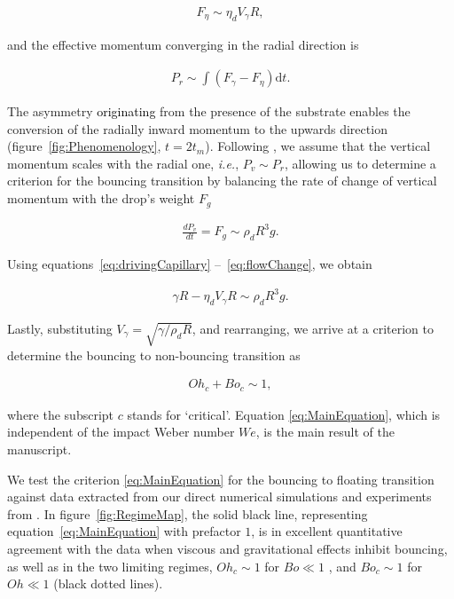 \documentclass{jfm}
\newcommand{\Ohn}{\mathit{Oh}}
\newcommand{\Ohc}{\mathit{Oh}_\mathit{c}}
\newcommand{\Wen}{\mathit{We}}
\newcommand{\Bon}{\mathit{Bo}}
\newcommand{\Boc}{\mathit{Bo}_\mathit{c}}
\newcommand{\revRev}[1]{\textcolor{black}{#1}}
\begin{document}
\begin{align}
	\label{eq:resistVisc}
	F_\eta \sim \eta_d V_\gamma R,
\end{align}

\noindent and the effective momentum converging in the radial direction is

\begin{align}
	\label{eq:flowChange}
	P_r \sim \int \left(F_\gamma - F_\eta\right) \mathrm{d}t.
\end{align}

\noindent The asymmetry \revRev{originating} from the presence of the substrate enables the conversion of the radially inward momentum to the upwards direction (figure~\ref{fig:Phenomenology}, $t = 2t_m$). Following \citet{mouterde2017merging, lecointre2019ballistics}, we assume that the vertical momentum scales with the radial one, {\it i.e.}, $P_v \sim P_r$, allowing us to determine a criterion for the bouncing transition by balancing the rate of change of vertical momentum with the drop's weight $F_g$

\begin{align}
	\label{eq:competeGravity1}
	\frac{dP_v}{dt} = F_g \sim \rho_d R^3 g.
\end{align}

\noindent Using equations~\eqref{eq:drivingCapillary} --~\eqref{eq:flowChange}, we obtain 

\begin{align}
	\label{eq:competeGravity3}
	\gamma R - \eta_d V_\gamma R \sim \rho_dR^3g.
\end{align}

\noindent Lastly, substituting $V_\gamma = \sqrt{\gamma/\rho_dR}$, and rearranging, we arrive at a criterion to determine the bouncing to non-bouncing transition as 

\begin{align}
	\label{eq:MainEquation}
	\Ohc + \Boc \sim 1,
\end{align}

\noindent where the subscript $c$ stands for \lq critical\rq.
Equation \eqref{eq:MainEquation}, which is independent of the impact Weber number $\Wen$, is the main result of the manuscript.
 
We test the criterion \eqref{eq:MainEquation} for the bouncing to floating transition against data extracted from our direct numerical simulations and experiments from \citet{biance2006, jha2020viscous, sanjay2022drop}. 
In figure~\ref{fig:RegimeMap}, the solid black line, representing equation~\eqref{eq:MainEquation} with prefactor $1$, is in excellent quantitative agreement with the data when viscous and gravitational effects inhibit bouncing, as well as in the two limiting regimes, $\Ohc \sim 1$ for $\Bon \ll 1$ \citep{jha2020viscous}, and $\Boc \sim 1$ for $\Ohn \ll 1$ \citep{biance2006} (black dotted lines).
\end{document}
